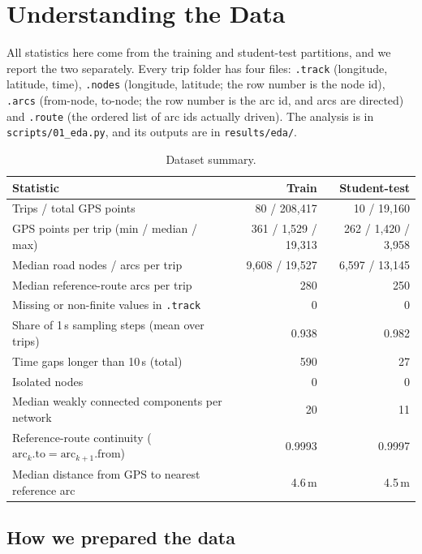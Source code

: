 \documentclass[11pt,a4paper]{article}
\newcommand{\code}[1]{\texttt{\small #1}}
\begin{document}
\section{Understanding the Data}

All statistics here come from the training and student-test partitions, and we report the two separately.
Every trip folder has four files:
\code{.track} (longitude, latitude, time),
\code{.nodes} (longitude, latitude; the row number is the node id),
\code{.arcs} (from-node, to-node; the row number is the arc id, and arcs are directed) and
\code{.route} (the ordered list of arc ids actually driven).
The analysis is in \code{scripts/01\_eda.py}, and its outputs are in \code{results/eda/}.

\begin{table}[H]
\centering
\small
\begin{tabular}{@{}lrr@{}}
\toprule
\textbf{Statistic} & \textbf{Train} & \textbf{Student-test} \\
\midrule
Trips / total GPS points & 80 / 208,417 & 10 / 19,160 \\
GPS points per trip (min / median / max) & 361 / 1,529 / 19,313 & 262 / 1,420 / 3,958 \\
Median road nodes / arcs per trip & 9,608 / 19,527 & 6,597 / 13,145 \\
Median reference-route arcs per trip & 280 & 250 \\
Missing or non-finite values in \code{.track} & 0 & 0 \\
Share of 1\,s sampling steps (mean over trips) & 0.938 & 0.982 \\
Time gaps longer than 10\,s (total) & 590 & 27 \\
Isolated nodes & 0 & 0 \\
Median weakly connected components per network & 20 & 11 \\
Reference-route continuity ($\text{arc}_k.\text{to} = \text{arc}_{k+1}.\text{from}$) & 0.9993 & 0.9997 \\
Median distance from GPS to nearest reference arc & 4.6\,m & 4.5\,m \\
\bottomrule
\end{tabular}
\caption{Dataset summary.}
\end{table}

\subsection{How we prepared the data}
\end{document}
